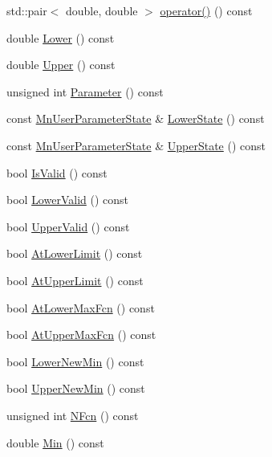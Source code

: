 \begin{DoxyCompactItemize}
\item 
std\+::pair$<$ double, double $>$ \mbox{\hyperlink{classROOT_1_1Minuit2_1_1MinosError_ae5c75a96400736de9741f6c5b8314e31}{operator()}} () const
\item 
double \mbox{\hyperlink{classROOT_1_1Minuit2_1_1MinosError_ac412aab9b0a59a427fbe7e3cfad47f0c}{Lower}} () const
\item 
double \mbox{\hyperlink{classROOT_1_1Minuit2_1_1MinosError_a0223fde13608aadee1f15b51d15b2bf6}{Upper}} () const
\item 
unsigned int \mbox{\hyperlink{classROOT_1_1Minuit2_1_1MinosError_a5d4ac177a8075a3698dbecac3a8c552b}{Parameter}} () const
\item 
const \mbox{\hyperlink{classROOT_1_1Minuit2_1_1MnUserParameterState}{Mn\+User\+Parameter\+State}} \& \mbox{\hyperlink{classROOT_1_1Minuit2_1_1MinosError_ac10a407a1cb13f4e0c1b4d21383d15df}{Lower\+State}} () const
\item 
const \mbox{\hyperlink{classROOT_1_1Minuit2_1_1MnUserParameterState}{Mn\+User\+Parameter\+State}} \& \mbox{\hyperlink{classROOT_1_1Minuit2_1_1MinosError_a89164c38dd7596c3164f1083eb9aac72}{Upper\+State}} () const
\item 
bool \mbox{\hyperlink{classROOT_1_1Minuit2_1_1MinosError_af6b7accfe397a06417ecc1f989d82e00}{Is\+Valid}} () const
\item 
bool \mbox{\hyperlink{classROOT_1_1Minuit2_1_1MinosError_a4b8c37c90bb53d98d3b4364a5ebc2228}{Lower\+Valid}} () const
\item 
bool \mbox{\hyperlink{classROOT_1_1Minuit2_1_1MinosError_a4180ae7ff87d9a2c0942c8e6ac81a8c0}{Upper\+Valid}} () const
\item 
bool \mbox{\hyperlink{classROOT_1_1Minuit2_1_1MinosError_ab5bac1c70b34e42714730cad95978b51}{At\+Lower\+Limit}} () const
\item 
bool \mbox{\hyperlink{classROOT_1_1Minuit2_1_1MinosError_a6c8a60e5b855f9d7164f441ea69c75eb}{At\+Upper\+Limit}} () const
\item 
bool \mbox{\hyperlink{classROOT_1_1Minuit2_1_1MinosError_a6ec22eac3b7dd1a281f1df710ed1dc74}{At\+Lower\+Max\+Fcn}} () const
\item 
bool \mbox{\hyperlink{classROOT_1_1Minuit2_1_1MinosError_a940c974f6ac87d22c4d340ef2fc88e8c}{At\+Upper\+Max\+Fcn}} () const
\item 
bool \mbox{\hyperlink{classROOT_1_1Minuit2_1_1MinosError_a9a806056992d1acb26420bf4895b46e9}{Lower\+New\+Min}} () const
\item 
bool \mbox{\hyperlink{classROOT_1_1Minuit2_1_1MinosError_a5f37bb106903e148029b8461f9bbbe25}{Upper\+New\+Min}} () const
\item 
unsigned int \mbox{\hyperlink{classROOT_1_1Minuit2_1_1MinosError_a4956b01f7899f42847617c378e5c86c2}{N\+Fcn}} () const
\item 
double \mbox{\hyperlink{classROOT_1_1Minuit2_1_1MinosError_a109ad5c9e19a97bda32f506718eaef02}{Min}} () const
\end{DoxyCompactItemize}


